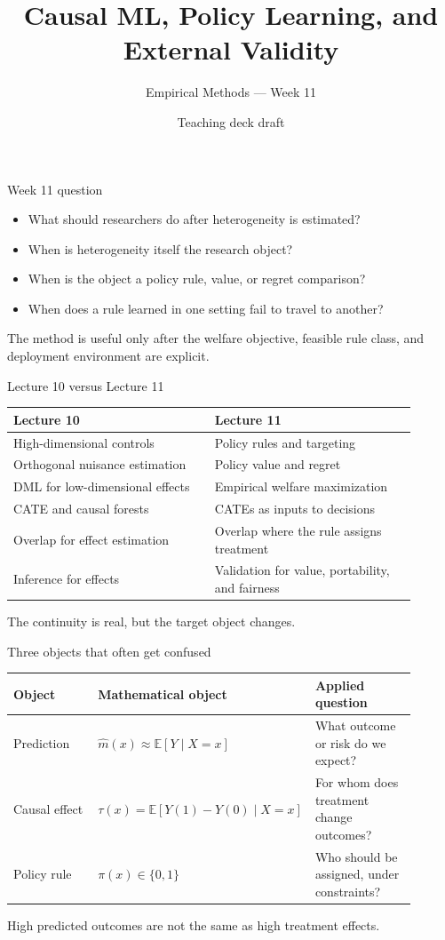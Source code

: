 \documentclass[aspectratio=169,11pt]{beamer}
\title{Causal ML, Policy Learning, and External Validity}
\subtitle{Empirical Methods --- Week 11}
\author{Teaching deck draft}
\date{}
\newcommand{\E}{\mathbb{E}}
\newcommand{\1}{\mathbf{1}}
\begin{document}
\begin{frame}
  \titlepage
\end{frame}

\begin{frame}{Week 11 question}
\begin{itemize}
    \item What should researchers do after heterogeneity is estimated?
    \item When is heterogeneity itself the research object?
    \item When is the object a policy rule, value, or regret comparison?
    \item When does a rule learned in one setting fail to travel to another?
\end{itemize}

\medskip
The method is useful only after the welfare objective, feasible rule class, and deployment environment are explicit.
\end{frame}

\begin{frame}{Lecture 10 versus Lecture 11}
\small
\begin{tabular}{p{0.45\linewidth} p{0.45\linewidth}}
\toprule
Lecture 10 & Lecture 11 \\
\midrule
High-dimensional controls & Policy rules and targeting \\
Orthogonal nuisance estimation & Policy value and regret \\
DML for low-dimensional effects & Empirical welfare maximization \\
CATE and causal forests & CATEs as inputs to decisions \\
Overlap for effect estimation & Overlap where the rule assigns treatment \\
Inference for effects & Validation for value, portability, and fairness \\
\bottomrule
\end{tabular}

\medskip
The continuity is real, but the target object changes.
\end{frame}

\begin{frame}{Three objects that often get confused}
\small
\begin{tabular}{p{0.25\linewidth} p{0.34\linewidth} p{0.31\linewidth}}
\toprule
Object & Mathematical object & Applied question \\
\midrule
Prediction & \(\widehat m(x)\approx \E[Y\mid X=x]\) & What outcome or risk do we expect? \\
Causal effect & \(\tau(x)=\E[Y(1)-Y(0)\mid X=x]\) & For whom does treatment change outcomes? \\
Policy rule & \(\pi(x)\in\{0,1\}\) & Who should be assigned, under constraints? \\
\bottomrule
\end{tabular}

\medskip
High predicted outcomes are not the same as high treatment effects.
\end{frame}
\end{document}
